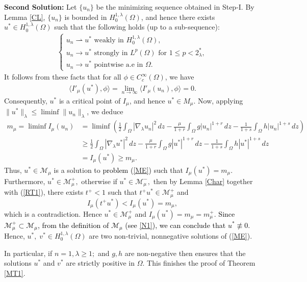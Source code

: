 \documentclass[12pt, notitlepage]{article}
\begin{document}
{\textbf{Second  Solution:}
Let $\{u_n\}$ be the minimizing sequence obtained in Step-I. By Lemma \ref{CL}, $\{u_n\}$ is bounded in $H^{1,\lambda}_0(\Omega)$, and hence there exists $u^*\in H^{1,\lambda}_0(\Omega)$ such that the following holds (up to a sub-sequence):  
\begin{align}
    \begin{cases}
        u_n\rightharpoonup u^* \text{ weakly in } H^{1,\lambda}_0(\Omega),\\
        u_n\to u^* \text{ strongly in } L^p(\Omega) \text{ for } 1\leq p<2^*_\lambda,\\
        u_n\to u^* \text{ pointwise a.e in } \Omega.
    \end{cases}
\end{align}
It follows from these facts that for all  $\phi\in C^\infty_c(\Omega)$, we have
\begin{align}\label{SOLL}
    \langle I'_\mu(u^*),\phi\rangle=\lim_{n\to\infty} \langle I'_\mu(u_n),\phi\rangle=0.
\end{align}
Consequently, $u^*$ is a critical point of $I_\mu$, and hence $u^*\in M_\mu$. Now,
applying $\|u^*\|_\lambda\leq\liminf\|u_n\|_\lambda$, we deduce
\begin{align}
   m_\mu=\liminf I_\mu(u_n)&=\liminf\left ( \frac{1}{2}\int_\Omega|\nabla_\lambda u_n|^2\, dz-\frac{\mu}{1+r}\int_\Omega g|u_n|^{1+r}\, dz-\frac{1}{1+s}\int_\Omega h|u_n|^{1+s}\, dz\right )\nonumber\\
    &\geq \frac{1}{2}\int_\Omega|\nabla_\lambda u^*|^2\, dz-\frac{\mu}{1+r}\int_\Omega g|u^*|^{1+r}\, dz-\frac{1}{1+s}\int_\Omega h|u^*|^{1+s}\, dz\nonumber\\
    &=I_\mu(u^*)\geq m_\mu.
\end{align}
Thus, $u^*\in\mathscr{M}_\mu$ is a solution to \textcolor{black}{problem (\ref{ME})} such that $I_\mu(u^*)=m_\mu$. Furthermore, $u^*\in\mathcal{M}^+_\mu,$ otherwise if $u^*\in\mathcal{M}^-_\mu,$ then by Lemma \ref{Char} together with (\ref{RT1}), there exists $t^+<1$ such that $t^+u^*\in\mathcal{M}^+_\mu$ and $$I_\mu(t^+u^*)<I_\mu(u^*)=m_\mu,$$
which is a contradiction. Hence $u^*\in\mathscr{M}^+_\mu$ and $I_\mu(u^*)=m_\mu=m^+_\mu.$ \textcolor{black}{Since $\mathcal{M}^+_\mu\subset \mathcal{M}_\mu$, from the definition of $\mathcal{M}_\mu$ (see \ref{N1}), we can conclude that $u^*\not\equiv 0$.}
Hence, $u^*,\; v^*\in H^{1,\lambda}_0(\Omega)$ are two non-trivial, nonnegative solutions of (\ref{ME}).

In particular, if $n=1,\lambda\geq 1;$ and $g,h$ are non-negative then \cite[Theorem 2.6]{KS} ensures that the solutions $u^*$ and $v^*$ are strictly positive in $\Omega.$ This finishes the proof of Theorem \ref{MT1}.
}
\end{document}
